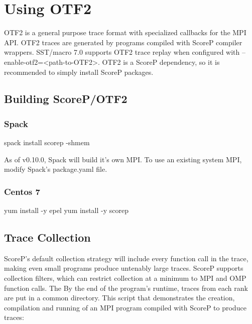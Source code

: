 
\section{Using OTF2}
\label{sec:tutorial:otf}
OTF2 is a general purpose trace format with specialized callbacks for the MPI API. OTF2 traces are generated by programs compiled with ScoreP compiler wrappers. SST/macro 7.0 supports OTF2 trace replay when configured with --enable-otf2=<path-to-OTF2>. OTF2 is a ScoreP dependency, so it is recommended to simply install ScoreP packages.
\subsection{Building ScoreP/OTF2}
\label{subset:otf:build}
\subsubsection{Spack}
\begin{ViFile}
spack install scorep -shmem
\end{ViFile}
As of v0.10.0, Spack will build it's own MPI. To use an existing system MPI, modify Spack's package.yaml file.
\subsubsection{Centos 7}
\begin{ViFile}
yum install -y epel
yum install	-y scorep
\end{ViFile}


\subsection{Trace Collection}
\label{subsec:otf:traceCollection}
ScoreP's default collection strategy will include every function call in the trace, making even small programs produce untenably large traces. ScoreP supports collection filters, which can restrict collection at a minimum to MPI and OMP function calls. The By the end of the program's runtime, traces from each rank are put in a common directory. This script that demonstrates the creation, compilation and running of an MPI program compiled with ScoreP to produce traces:

